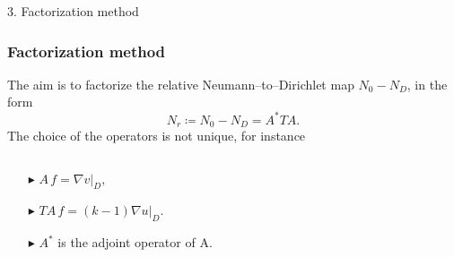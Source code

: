 \documentclass[10pt,xcolor={dvipsnames}]{beamer}
\theoremstyle{plain}
\theoremstyle{plain}
\begin{document}
\begin{frame}[noframenumbering]
 \begin{center}
 \Large
 {\color{purple} 3. Factorization method}
 \end{center}
\end{frame}
\begin{frame}
 \frametitle{Factorization method}
{ \small
 The aim is to factorize the relative Neumann--to--Dirichlet map ${N_0} - {N_D}$, in the form}
\begin{equation}
 {N_r}\coloneqq{N_0} - {N_D} = A^*TA.
\end{equation}
{\small
The choice of the operators is not unique, for instance
}
\begin{columns}[T]
\begin{column}{0.5\textwidth}
\vspace{0.8cm}
\begin{itemize}
 \item[$\blacktriangleright$]
 $A\,f = \nabla v|_D,$
 \item[$\blacktriangleright$]
 $TA\,f = 
 (k-1) \nabla u|_D.$
 \item[$\blacktriangleright$]
 $A^*$ is the adjoint operator of A. 
\end{itemize}\end{column}
\begin{column}{0.5\textwidth}
\begin{center}
\end{center}
\end{column}
\end{columns}

\end{frame}
\end{document}
